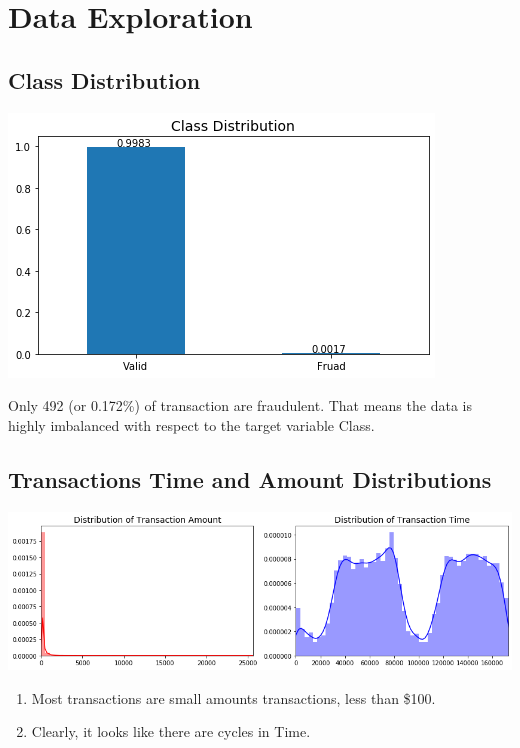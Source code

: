 \documentclass[20pt,a4paper]{article}
\begin{document}
\section{Data Exploration}
    \subsection{Class Distribution}
        \begin{center}
        \includegraphics[scale=0.45]{graphs/output_16_0.png}
        \end{center}
        Only 492 (or 0.172\%) of transaction are fraudulent. That means the data
        is highly imbalanced with respect to the target variable Class.

    \subsection{Transactions Time and Amount Distributions}
        \begin{center}
        \includegraphics[scale=0.45]{graphs/output_19_0.png}
        \end{center}
        \begin{enumerate}[label=\roman*)]
          \item Most transactions are small amounts transactions, less than \$100.
          \item Clearly, it looks like there are cycles in Time.
        \end{enumerate}
\end{document}

